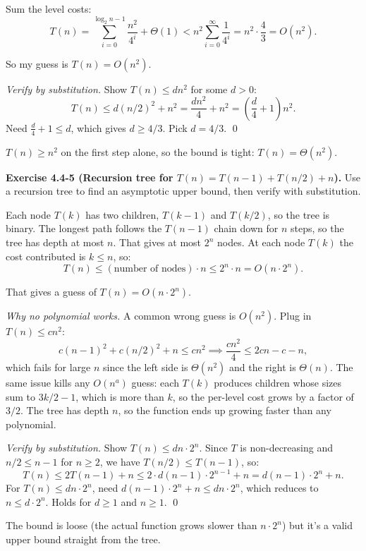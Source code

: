 \documentclass{article}
\theoremstyle{theorem}
\theoremstyle{definition}
\theoremstyle{remark}
\begin{document}
Sum the level costs:
\[
  T(n) = \sum_{i=0}^{\log_2 n - 1} \frac{n^2}{4^i} + \Theta(1) < n^2 \sum_{i=0}^{\infty} \frac{1}{4^i} = n^2 \cdot \frac{4}{3} = O(n^2).
\]

So my guess is $T(n) = O(n^2)$.

\emph{Verify by substitution.} Show $T(n) \leq d n^2$ for some $d > 0$:
\[
  T(n) \leq d(n/2)^2 + n^2 = \frac{d n^2}{4} + n^2 = \left(\frac{d}{4} + 1\right) n^2.
\]
Need $\frac{d}{4} + 1 \leq d$, which gives $d \geq 4/3$. Pick $d = 4/3$. \qed

$T(n) \geq n^2$ on the first step alone, so the bound is tight: $T(n) = \Theta(n^2)$.

\bigskip

\textbf{Exercise 4.4-5 (Recursion tree for $T(n) = T(n-1) + T(n/2) + n$).}
Use a recursion tree to find an asymptotic upper bound, then verify with substitution.

Each node $T(k)$ has two children, $T(k-1)$ and $T(k/2)$, so the tree is binary. The longest path follows the $T(n-1)$ chain down for $n$ steps, so the tree has depth at most $n$. That gives at most $2^n$ nodes. At each node $T(k)$ the cost contributed is $k \leq n$, so:
\[
  T(n) \leq (\text{number of nodes}) \cdot n \leq 2^n \cdot n = O(n \cdot 2^n).
\]

That gives a guess of $T(n) = O(n \cdot 2^n)$.

\emph{Why no polynomial works.} A common wrong guess is $O(n^2)$. Plug in $T(n) \leq c n^2$:
\[
  c(n-1)^2 + c(n/2)^2 + n \leq c n^2 \implies \frac{c n^2}{4} \leq 2 c n - c - n,
\]
which fails for large $n$ since the left side is $\Theta(n^2)$ and the right is $\Theta(n)$. The same issue kills any $O(n^a)$ guess: each $T(k)$ produces children whose sizes sum to $3k/2 - 1$, which is more than $k$, so the per-level cost grows by a factor of $3/2$. The tree has depth $n$, so the function ends up growing faster than any polynomial.

\emph{Verify by substitution.} Show $T(n) \leq d n \cdot 2^n$. Since $T$ is non-decreasing and $n/2 \leq n-1$ for $n \geq 2$, we have $T(n/2) \leq T(n-1)$, so:
\[
  T(n) \leq 2 T(n-1) + n \leq 2 \cdot d (n-1) \cdot 2^{n-1} + n = d (n-1) \cdot 2^n + n.
\]
For $T(n) \leq d n \cdot 2^n$, need $d(n-1) \cdot 2^n + n \leq d n \cdot 2^n$, which reduces to $n \leq d \cdot 2^n$. Holds for $d \geq 1$ and $n \geq 1$. \qed

The bound is loose (the actual function grows slower than $n \cdot 2^n$) but it's a valid upper bound straight from the tree.
\end{document}
